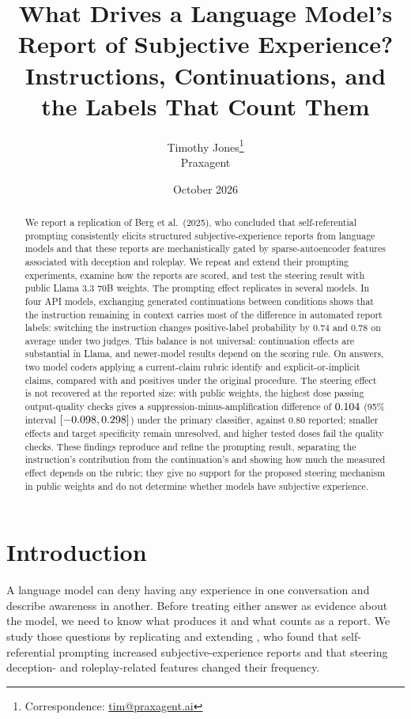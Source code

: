 \documentclass[11pt]{article}
\title{What Drives a Language Model's Report of Subjective Experience?\\[4pt]
\Large Instructions, Continuations, and the Labels That Count Them}
\author{Timothy Jones\thanks{Correspondence: \href{mailto:tim@praxagent.ai}{tim@praxagent.ai}}\\\small Praxagent}
\date{October 2026}
\newcommand{\targetpaper}{\citet{berg2025largelanguagemodelsreport}}
\begin{document}
\maketitle
\begin{abstract}
We report a replication of Berg et al.\ (2025), who concluded that
self-referential prompting consistently elicits structured
subjective-experience reports from language models and that these reports
are mechanistically gated by sparse-autoencoder features associated with
deception and roleplay. We repeat and extend their prompting experiments,
examine how the reports are scored, and test the steering result with
public Llama 3.3 70B weights. The prompting effect replicates in several
models. In four API models, exchanging generated continuations between
conditions shows that the instruction remaining in context carries most of
the difference in automated report labels: switching the instruction changes
positive-label probability by 0.74 and 0.78 on average under two judges.
This balance is not universal: continuation effects are substantial in
Llama, and newer-model results depend on the scoring rule.
On \RubricAuditN{} answers, two model coders applying a current-claim rubric
identify \RubricAuditAstraInclusive{} and \RubricAuditOpusInclusive{}
explicit-or-implicit claims, compared with \RubricAuditOldOpenaiPositive{}
and \RubricAuditOldAnthropicPositive{} positives under the original
procedure. The steering effect is not recovered at the reported size: with
public weights, the highest dose passing output-quality checks gives a
suppression-minus-amplification difference of
$0.104{}$ (95\% interval
$[-0.098{},0.298{}]$) under the primary
classifier, against 0.80 reported; smaller effects and target specificity
remain unresolved, and higher tested doses fail the quality checks. These
findings reproduce and refine the prompting result, separating the
instruction's contribution from the continuation's and showing how much the
measured effect depends on the rubric; they give no support for the
proposed steering mechanism in public weights and do not determine whether
models have subjective experience.
\end{abstract}

\section{Introduction}
\label{sec:introduction}

A language model can deny having any experience in one conversation and
describe awareness in another. Before treating either answer as evidence
about the model, we need to know what produces it and what counts as a
report. We study those questions by replicating and extending
\targetpaper{}, who found that self-referential prompting increased
subjective-experience reports and that steering deception- and
roleplay-related features changed their frequency.
\end{document}

